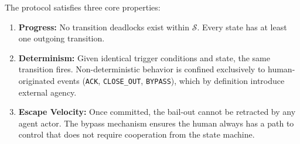 \bigskip

The protocol satisfies three core properties:

\begin{enumerate}
  \item \textbf{Progress:} No transition deadlocks exist within $\mathcal{S}$. Every state has at least one outgoing transition.
  \item \textbf{Determinism:} Given identical trigger conditions and state, the same transition fires. Non-deterministic behavior is confined exclusively to human-originated events (\texttt{ACK}, \texttt{CLOSE\_OUT}, \texttt{BYPASS}), which by definition introduce external agency.
  \item \textbf{Escape Velocity:} Once committed, the bail-out cannot be retracted by any agent actor. The bypass mechanism ensures the human always has a path to control that does not require cooperation from the state machine.
\end{enumerate}